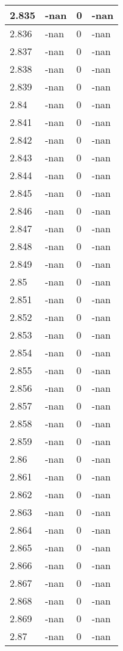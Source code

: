 \documentclass[a4paper,14pt]{extarticle}
\begin{document}
\begin{longtable}{||m{3cm}||m{3cm}|m{3cm}||m{3cm}||}
\hline
2.835 & -nan & 0 & -nan\\
\hline
2.836 & -nan & 0 & -nan\\
\hline
2.837 & -nan & 0 & -nan\\
\hline
2.838 & -nan & 0 & -nan\\
\hline
2.839 & -nan & 0 & -nan\\
\hline
2.84 & -nan & 0 & -nan\\
\hline
2.841 & -nan & 0 & -nan\\
\hline
2.842 & -nan & 0 & -nan\\
\hline
2.843 & -nan & 0 & -nan\\
\hline
2.844 & -nan & 0 & -nan\\
\hline
2.845 & -nan & 0 & -nan\\
\hline
2.846 & -nan & 0 & -nan\\
\hline
2.847 & -nan & 0 & -nan\\
\hline
2.848 & -nan & 0 & -nan\\
\hline
2.849 & -nan & 0 & -nan\\
\hline
2.85 & -nan & 0 & -nan\\
\hline
2.851 & -nan & 0 & -nan\\
\hline
2.852 & -nan & 0 & -nan\\
\hline
2.853 & -nan & 0 & -nan\\
\hline
2.854 & -nan & 0 & -nan\\
\hline
2.855 & -nan & 0 & -nan\\
\hline
2.856 & -nan & 0 & -nan\\
\hline
2.857 & -nan & 0 & -nan\\
\hline
2.858 & -nan & 0 & -nan\\
\hline
2.859 & -nan & 0 & -nan\\
\hline
2.86 & -nan & 0 & -nan\\
\hline
2.861 & -nan & 0 & -nan\\
\hline
2.862 & -nan & 0 & -nan\\
\hline
2.863 & -nan & 0 & -nan\\
\hline
2.864 & -nan & 0 & -nan\\
\hline
2.865 & -nan & 0 & -nan\\
\hline
2.866 & -nan & 0 & -nan\\
\hline
2.867 & -nan & 0 & -nan\\
\hline
2.868 & -nan & 0 & -nan\\
\hline
2.869 & -nan & 0 & -nan\\
\hline
2.87 & -nan & 0 & -nan\\

\end{longtable}
\end{document}
